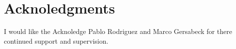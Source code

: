 \section{Acknoledgments}
	I would like the Acknoledge Pablo Rodriguez and Marco Gersabeck for there continued support and supervision.
